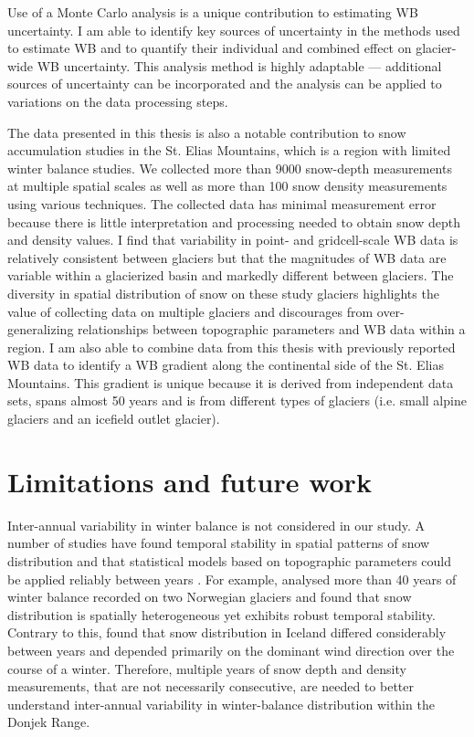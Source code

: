 \documentclass{sfuthesis}
\begin{document}
Use of a Monte Carlo analysis is a unique contribution to estimating WB uncertainty. I am able to identify key sources of uncertainty in the methods used to estimate WB and to quantify their individual and combined effect on glacier-wide WB uncertainty. This analysis method is highly adaptable --- additional sources of uncertainty can be incorporated and the analysis can be applied to variations on the data processing steps. 

The data presented in this thesis is also a notable contribution to snow accumulation studies in the St. Elias Mountains, which is a region with limited winter balance studies. We collected more than 9000 snow-depth measurements at multiple spatial scales as well as more than 100 snow density measurements using various techniques. The collected data has minimal measurement error because there is little interpretation and processing needed to obtain snow depth and density values. I find that variability in point- and gridcell-scale WB data is relatively consistent between glaciers but that the magnitudes of WB data are variable within a glacierized basin and markedly different between glaciers. The diversity in spatial distribution of snow on these study glaciers highlights the value of collecting data on multiple glaciers and discourages from over-generalizing relationships between topographic parameters and WB data within a region. I am also able to combine data from this thesis with previously reported WB data to identify a WB gradient along the continental side of the St. Elias Mountains. This gradient is unique because it is derived from independent data sets, spans almost 50 years and is from different types of glaciers (i.e. small alpine glaciers and an icefield outlet glacier).


\section{Limitations and future work}

Inter-annual variability in winter balance is not considered in our study. A number of studies have found temporal stability in spatial patterns of snow distribution and that statistical models based on topographic parameters could be applied reliably between years \citep[e.g.][]{Grunewald2013}. For example, \cite{Walmsley2015} analysed more than 40 years of winter balance recorded on two Norwegian glaciers and found that snow distribution is spatially heterogeneous yet exhibits robust temporal stability. Contrary to this, \cite{Crochet2007} found that snow distribution in Iceland differed considerably between years and depended primarily on the dominant wind direction over the course of a winter. Therefore, multiple years of snow depth and density measurements, that are not necessarily consecutive, are needed to better understand inter-annual variability in winter-balance distribution within the Donjek Range.
\end{document}
